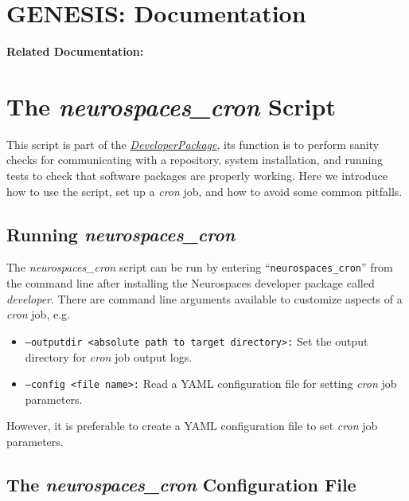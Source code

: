 \documentclass[12pt]{article}
\begin{document}
\section*{GENESIS: Documentation}

{\bf Related Documentation:}

\section*{The {\it neurospaces\_cron} Script}

This script is part of the \href{../developer-package}{\it DeveloperPackage}, its function is to perform sanity checks for communicating with a repository, system installation, and running tests to check that software packages are properly working. Here we introduce how to use the script, set up a {\it cron} job, and how to avoid some common pitfalls.

\subsection*{Running {\it neurospaces\_cron}}

The {\it neurospaces\_cron} script can be run by entering ``{\tt neurospaces\_cron}'' from the command line after installing the Neurospaces developer package called {\it developer}. There are command line arguments available to customize aspects of a {\it cron} job, e.g.
\begin{itemize}
   \item {\tt --outputdir <absolute path to target directory>:} Set the output directory for {\it cron} job output logs.
   \item {\tt --config <file name>:} Read a YAML configuration file for setting {\it cron} job parameters.
\end{itemize}
However, it is preferable to create a YAML configuration file to set {\it cron} job parameters.

\subsection*{The  {\it neurospaces\_cron} Configuration File}
\end{document}
